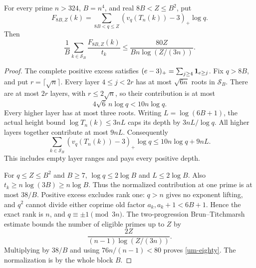 \begin{theorem}\label{um-mean}
For every prime \(n>324\), \(B=n^4\), and real \(8B<Z\leq B^2\),
put
\[
 F_{8B,Z}(k)=\sum_{8B<q\leq Z}(v_q(T_n(k))-3)_+\log q.
\]
Then
\begin{equation}\label{um-eighty}
 \frac1B\sum_{k\in\mathcal S_B}\frac{F_{8B,Z}(k)}{t_k}
       \leq\frac{80Z}{Bn\log(Z/(3n))}.
\end{equation}
\end{theorem}
\begin{proof}
The complete positive excess satisfies
\((e-3)_+=\sum_{j\geq4}{\bf1}_{e\geq j}\).
Fix \(q>8B\), and put \(r=\lceil\sqrt n\rceil\).
Every layer \(4\leq j<2r\) has at most \(\sqrt{6n}\) roots
in \(\mathcal S_B\). There are at most \(2r\) layers, with
\(r\leq2\sqrt n\), so their contribution is at most
\[
 4\sqrt6\,n\log q<10n\log q.
\]
Every higher layer has at most three roots.
Writing \(L=\log(6B+1)\), the actual height bound
\(\log T_n(k)\leq3nL\) caps its depth by \(3nL/\log q\).
All higher layers together contribute at most \(9nL\).
Consequently
\begin{equation}\label{um-prime-ledger}
 \sum_{k\in\mathcal S_B}(v_q(T_n(k))-3)_+\log q
       \leq10n\log q+9nL.
\end{equation}
This includes empty layer ranges and pays every positive depth.

For \(q\leq Z\leq B^2\) and \(B\geq7\),
\(\log q\leq2\log B\) and \(L\leq2\log B\).
Also \(t_k\geq n\log(3B)\geq n\log B\). Thus the normalized
contribution at one prime is at most \(38/B\).
Positive excess excludes rank one: \(q>n\) gives no exponent
lifting, and \(q^2\) cannot divide either coprime old factor
\(a_k,a_k+1<6B+1\). Hence the exact rank is \(n\), and
\(q\equiv\pm1\pmod{3n}\).
The two-progression Brun--Titchmarsh estimate bounds the number
of eligible primes up to \(Z\) by
\[
 \frac{2Z}{(n-1)\log(Z/(3n))}.
\]
Multiplying by \(38/B\) and using \(76n/(n-1)<80\) proves
\eqref{um-eighty}. The normalization is by the whole block \(B\).
\end{proof}

